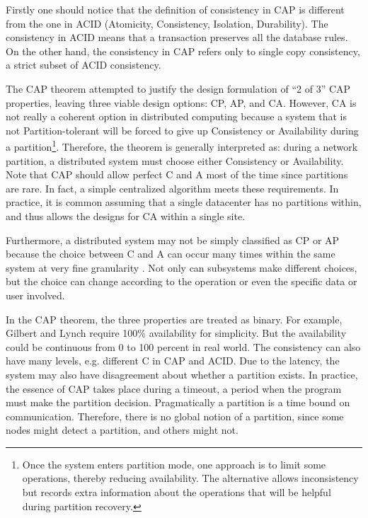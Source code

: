 \documentclass[11pt]{book}
\begin{document}
Firstly one should notice that the definition of consistency in CAP is different from the one in ACID (Atomicity, Consistency, Isolation, Durability). The consistency in ACID means that a transaction preserves all the database rules. On the other hand, the consistency in CAP refers only to single copy consistency, a strict subset of ACID consistency. 

The CAP theorem attempted to justify the design formulation of ``2 of 3'' CAP properties, leaving three viable design options: CP, AP, and CA. However, CA is not really a coherent option in distributed computing because a system that is not Partition-tolerant will be forced to give up Consistency or Availability during a partition\footnote{Once the system enters partition mode, one approach is to limit some operations, thereby reducing availability. The alternative allows inconsistency but records extra information about the operations that will be helpful during partition recovery.}. Therefore, the theorem is generally interpreted as: during a network partition, a distributed system must choose either Consistency or Availability. Note that CAP should allow perfect C and A most of the time since partitions are rare. In fact, a simple centralized algorithm meets these requirements. In practice, it is common assuming that a single datacenter has no partitions within, and thus allows the designs for CA within a single site.

Furthermore, a distributed system may not be simply classified as CP or AP because the choice between C and A can occur many times within the same system at very fine granularity \cite{Brewer:2012}. Not only can subsystems make different choices, but the choice can change according to the operation or even the specific data or user involved.

In the CAP theorem, the three properties are treated as binary. For example, Gilbert and Lynch require 100\% availability for simplicity. But the availability could be continuous from 0 to 100 percent in real world. The consistency can also have many levels, e.g. different C in CAP and ACID. Due to the latency, the system may also have disagreement about whether a partition exists. In practice, the essence of CAP takes place during a timeout, a period when the program must make the partition decision. Pragmatically a partition is a time bound on communication. Therefore, there is no global notion of a partition, since some nodes might detect a partition, and others might not.
\end{document}
